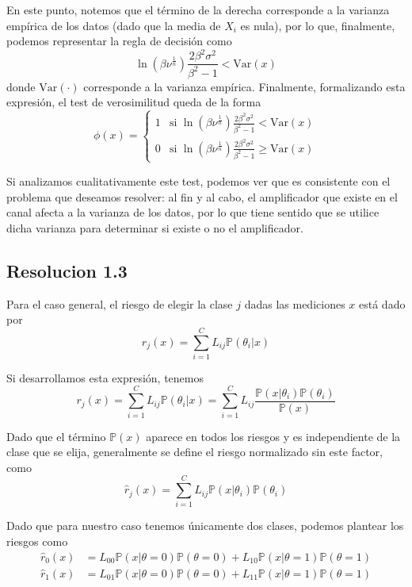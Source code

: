 \documentclass[
  11pt,
  letterpaper,
   addpoints,
   answers
  ]{exam}
\begin{document}
\begin{questions}
\begin{solution}
En este punto, notemos que el término de la derecha corresponde a la varianza empírica de los datos (dado que la media de \(X_i\) es nula), por lo que, finalmente, podemos representar la regla de decisión como
\[
\ln \left( \beta \nu^{\frac{1}{n}} \right) \frac{2 \beta^2 \sigma^2}{\beta^2 - 1} < \text{Var}(x)
\]
donde \(\text{Var}(\cdot)\) corresponde a la varianza empírica. Finalmente, formalizando esta expresión, el test de verosimilitud queda de la forma
\[
\phi(x) = \begin{cases}
1 & \text{si } \ln \left( \beta \nu^{\frac{1}{n}} \right) \frac{2 \beta^2 \sigma^2}{\beta^2 - 1} < \text{Var}(x) \\
0 & \text{si } \ln \left( \beta \nu^{\frac{1}{n}} \right) \frac{2 \beta^2 \sigma^2}{\beta^2 - 1} \geq \text{Var}(x)
\end{cases}
\]

Si analizamos cualitativamente este test, podemos ver que es consistente con el problema que deseamos resolver: al fin y al cabo, el amplificador que existe en el canal afecta a la varianza de los datos, por lo que tiene sentido que se utilice dicha varianza para determinar si existe o no el amplificador.
\subsection*{Resolucion 1.3}

Para el caso general, el riesgo de elegir la clase \( j \) dadas las mediciones \( x \) está dado por
\[
r_j(x) = \sum_{i=1}^{C} L_{ij} \mathbb{P}(\theta_i | x)
\]

Si desarrollamos esta expresión, tenemos
\[
r_j(x) = \sum_{i=1}^{C} L_{ij} \mathbb{P}(\theta_i | x) = \sum_{i=1}^{C} L_{ij} \frac{\mathbb{P}(x | \theta_i) \mathbb{P}(\theta_i)}{\mathbb{P}(x)}
\]

Dado que el término \(\mathbb{P}(x)\) aparece en todos los riesgos y es independiente de la clase que se elija, generalmente se define el riesgo normalizado sin este factor, como
\[
\hat{r}_j(x) = \sum_{i=1}^{C} L_{ij} \mathbb{P}(x | \theta_i) \mathbb{P}(\theta_i)
\]

Dado que para nuestro caso tenemos únicamente dos clases, podemos plantear los riesgos como
\begin{align}
\hat{r}_0(x) &= L_{00} \mathbb{P}(x | \theta = 0) \mathbb{P}(\theta = 0) + L_{10} \mathbb{P}(x | \theta = 1) \mathbb{P}(\theta = 1) \\
\hat{r}_1(x) &= L_{01} \mathbb{P}(x | \theta = 0) \mathbb{P}(\theta = 0) + L_{11} \mathbb{P}(x | \theta = 1) \mathbb{P}(\theta = 1)
\end{align}


\end{solution}
\end{questions}
\end{document}
